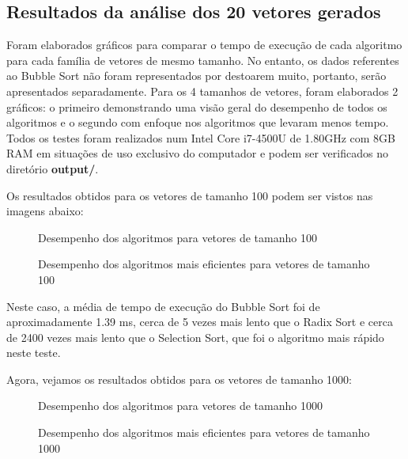 \documentclass[12pt,a4paper]{article}
\begin{document}
\subsection{Resultados da análise dos 20 vetores gerados}
Foram elaborados gráficos para comparar o tempo de execução de cada algoritmo para cada família de vetores de mesmo tamanho. No entanto, os dados referentes ao Bubble Sort não foram representados por destoarem muito, portanto, serão apresentados separadamente. Para os 4 tamanhos de vetores, foram elaborados 2 gráficos: o primeiro demonstrando uma visão geral do desempenho de todos os algoritmos e o segundo com enfoque nos algoritmos que levaram menos tempo. Todos os testes foram realizados num Intel Core i7-4500U de 1.80GHz com 8GB RAM em situações de uso exclusivo do computador e podem ser verificados no diretório \textbf{output/}.

Os resultados obtidos para os vetores de tamanho 100 podem ser vistos nas imagens abaixo:
\begin{figure}[h]
	\centering
	\caption{Desempenho dos algoritmos para vetores de tamanho 100}
\end{figure}

\pagebreak

\begin{figure}[h]
	\centering
	\caption{Desempenho dos algoritmos mais eficientes para vetores de tamanho 100}
\end{figure}

Neste caso, a média de tempo de execução do Bubble Sort foi de aproximadamente 1.39 ms, cerca de 5 vezes mais lento que o Radix Sort e cerca de 2400 vezes mais lento que o Selection Sort, que foi o algoritmo mais rápido neste teste.

Agora, vejamos os resultados obtidos para os vetores de tamanho 1000:

\begin{figure}[h]
	\centering
	\caption{Desempenho dos algoritmos para vetores de tamanho 1000}
\end{figure}

\pagebreak

\begin{figure}[h]
	\centering
	\caption{Desempenho dos algoritmos mais eficientes para vetores de tamanho 1000}
\end{figure}
\end{document}
